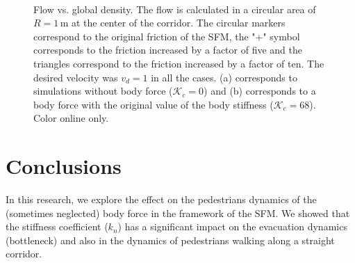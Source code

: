 \documentclass[preprint,12pt]{elsarticle}
\begin{document}
\begin{figure}[!htbp]
\centering
    \ 
    \\
\caption[width=0.47\columnwidth]{Flow vs. global density. The flow is calculated in a circular area of $R=1\,$m at the center of the corridor. The circular markers correspond to the original friction of the SFM, the "+" symbol corresponds to the friction increased by a factor of five and the triangles correspond to the friction increased by a factor of ten. The desired velocity was $v_d=1$ in all the cases. (a) corresponds to simulations without body force ($\mathcal{K}_c =$0) and (b) corresponds to a body force with the original value of the body stiffness ($\mathcal{K}_c =$68). Color online only.}
\label{flow_density}
\end{figure}



\section{\label{conclusions}Conclusions}


In this research, we explore the effect on the pedestrians dynamics of the (sometimes neglected) body force in the framework of the SFM. We showed that the stiffness coefficient ($k_n$) has a significant impact on the evacuation dynamics (bottleneck) and also in the dynamics of pedestrians walking along a straight corridor.\\
\end{document}
